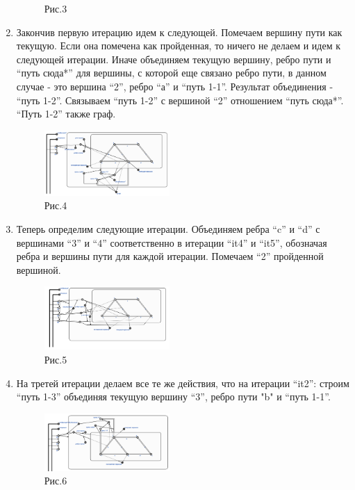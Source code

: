 \documentclass[10pt,a4paper,twocolumn]{article}
\begin{document}
\begin{enumerate}
\begin{figure}[h]
		\caption{Рис.3}
	\end{figure}
	\item Закончив первую итерацию идем к следующей. Помечаем вершину пути как текущую. Если она помечена как пройденная, то ничего не делаем и идем к следующей итерации. Иначе объединяем текущую вершину, ребро пути и ``путь сюда*'' для вершины, с которой еще связано ребро пути, в данном случае - это вершина ``2'', ребро ``а'' и ``путь 1-1''. Результат объединения - ``путь 1-2''. Связываем ``путь 1-2'' с вершиной ``2'' отношением ``путь сюда*''. ``Путь 1-2'' также граф.
	\begin{figure}[h]
		\includegraphics[width=0.45\textwidth]{img/img4.png}
		\caption{Рис.4}
	\end{figure}
	\item Теперь определим следующие итерации. Объединяем ребра ``c'' и ``d'' с вершинами ``3'' и ``4'' соответственно в итерации ``it4'' и ``it5'', обозначая ребра и вершины пути для каждой итерации. Помечаем ``2'' пройденной вершиной.
	\begin{figure}[h]
		\includegraphics[width=0.45\textwidth]{img/img5.png}
		\caption{Рис.5}
	\end{figure}
    \newpage
	\item На третей итерации делаем все те же действия, что на итерации ``it2'': строим ``путь 1-3'' объединяя текущую вершину ``3'', ребро пути "b" и ``путь 1-1''.
	\begin{figure}[h]
		\includegraphics[width=0.45\textwidth]{img/img6.png}
		\caption{Рис.6}
	\end{figure}

\end{enumerate}
\end{document}
